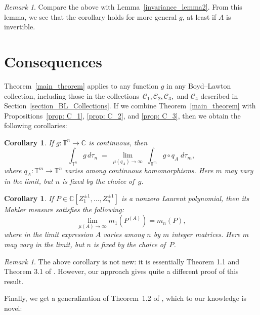 \documentclass[12pt]{amsart}
\theoremstyle{plain}
\newtheorem{corollary}[theorem]{Corollary}
\theoremstyle{definition}
\theoremstyle{remark}
\newtheorem{remark}[theorem]{Remark}
\numberwithin{theorem}{section}
\numberwithin{equation}{section} %
\newcommand{\CC}{\mathbb{C}}
\newcommand{\bC}{{\mathbb{C}}}
\newcommand{\mc}{\mathcal}
\newcommand{\torus}{{\mathbb{T}}}
\begin{document}
\begin{remark}
Compare the above with Lemma~\ref{invariance_lemma2}. From this lemma, we see that the corollary holds for more general $g$, at least if $A$ is invertible.
\end{remark}




\section{Consequences}

Theorem~\ref{main_theorem} applies to any function $g$ in any Boyd--Lawton collection, including those
in the collections~$\mc C_1, \mc C_2, \mc C_3,$ and $\mc C_4$ described in Section~\ref{section_BL_Collections}.
If we combine Theorem~\ref{main_theorem} with Propositions~\ref{prop: C_1}, \ref{prop: C_2}, and \ref{prop: C_3}, 
then we obtain the following corollaries:

\begin{corollary}
If $g\colon\torus^n\to\bC$ is continuous,
then
$$
\int_{\torus^{n}} g \, d \tau_{n} \; = \;  \lim_{\mu\left( q_A \right)\to \infty}\;  \int_{\torus^m} g \circ q_A \; d \tau_m,
$$
where $q_A\colon \torus^m \to\torus^n$ varies among continuous homomorphisms. Here $m$ may vary in the limit, but $n$ is fixed by the choice of~$g$. %
\end{corollary}

\begin{corollary}
If $P \in\CC\left[Z_1^{\pm1},\dots, Z_n^{\pm1}\right]$ is a nonzero Laurent polynomial, then 
its Mahler measure satisfies the following:
$$
 \lim_{\mu\left({A}\right) \to\infty} m_1\left(P^{(A)}\right) = m_n(P),
$$
where in the limit expression $A$ varies among $n$ by $m$ integer matrices. Here $m$ may vary in the limit, but $n$ is fixed by the choice of~$P$. %
\end{corollary}


\begin{remark}
The above corollary is not new: it is essentially Theorem 1.1 and Theorem 3.1 of  \cite{Brunault2024}. However, our approach gives quite a different proof of this result.
\end{remark}

Finally, we get a generalization of Theorem~1.2 of \cite{Issa2013}, which to our knowledge is novel:
\end{document}
